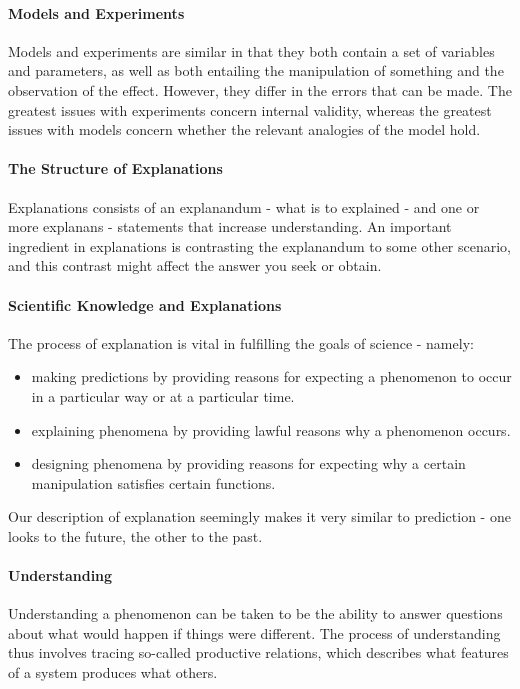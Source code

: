 \paragraph{Models and Experiments}
Models and experiments are similar in that they both contain a set of variables and parameters, as well as both entailing the manipulation of something and the observation of the effect. However, they differ in the errors that can be made. The greatest issues with experiments concern internal validity, whereas the greatest issues with models concern whether the relevant analogies of the model hold.

\paragraph{The Structure of Explanations}
Explanations consists of an explanandum - what is to explained - and one or more explanans - statements that increase understanding. An important ingredient in explanations is contrasting the explanandum to some other scenario, and this contrast might affect the answer you seek or obtain.

\paragraph{Scientific Knowledge and Explanations}
The process of explanation is vital in fulfilling the goals of science - namely:
\begin{itemize}
	\item making predictions by providing reasons for expecting a phenomenon to occur in a particular way or at a particular time.
	\item explaining phenomena by providing lawful reasons why a phenomenon occurs.
	\item designing phenomena by providing reasons for expecting why a certain manipulation satisfies certain functions.
\end{itemize}
Our description of explanation seemingly makes it very similar to prediction - one looks to the future, the other to the past.

\paragraph{Understanding}
Understanding a phenomenon can be taken to be the ability to answer questions about what would happen if things were different. The process of understanding thus involves tracing so-called productive relations, which describes what features of a system produces what others.

